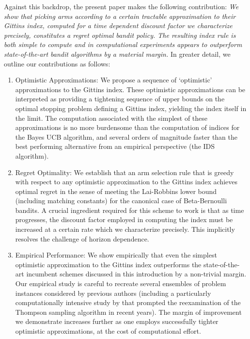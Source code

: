 Against this backdrop, the present paper makes the following contribution: 
\newline
\newline
\noindent
{\em We show that picking arms according to a certain tractable approximation to their Gittins index, computed for a time dependent discount factor we characterize precisely, constitutes a regret optimal bandit policy. The resulting index rule is both simple to compute and in computational experiments appears to outperform state-of-the-art bandit algorithms by a material margin.} 
\newline
\newline
In greater detail, we outline our contributions as follows:

\begin{enumerate}

\item Optimistic Approximations: We propose a sequence of `optimistic' approximations to the Gittins index. These optimistic approximations can be interpreted as providing a tightening sequence of upper bounds on the optimal stopping problem defining a Gittins index, yielding the index itself in the limit. The computation associated with the simplest of these approximations is no more burdensome than the computation of indices for the Bayes UCB algorithm, and several orders of magnitude faster than the best performing alternative from an empirical perspective (the IDS algorithm). 
\item Regret Optimality: We establish that an arm selection rule that is greedy with respect to any optimistic approximation to the Gittins index achieves optimal regret in the sense of meeting the Lai-Robbins lower bound (including matching constants) for the canonical case of Beta-Bernoulli bandits. A crucial ingredient required for this scheme to work is that as time progresses, the discount factor employed in computing the index must be increased at a certain rate which we characterize precisely. This implicitly resolves the challenge of horizon dependence. 
\item Empirical Performance: We show empirically that even the simplest optimistic approximation to the Gittins index outperforms the state-of-the-art incumbent schemes discussed in this introduction by a non-trivial margin. Our empirical study is careful to recreate several ensembles of problem instances considered by previous authors (including a particularly computationally intensive study by \cite{chapelle2011empirical} that prompted the reexamination of the Thompson sampling algorithm in recent years). The margin of improvement we demonstrate increases further as one employs successfully tighter optimistic approximations, at the cost of computational effort. 
\end{enumerate}

